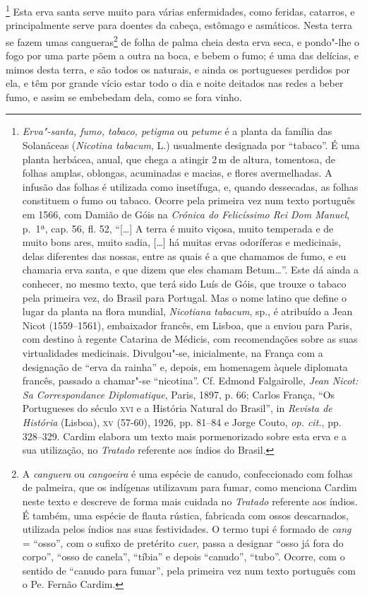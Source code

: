\footnote{ \textit{Erva"-santa, fumo, tabaco,
petigma} ou \textit{petume} é a planta da família das Solanáceas
(\textit{Nicotina tabacum}, L.) usualmente designada por ``tabaco''. É
uma planta herbácea, anual, que chega a atingir 2\,m de altura,
tomentosa, de folhas amplas, oblongas, acuminadas e macias, e flores
avermelhadas. A infusão das folhas é utilizada como insetífuga, e,
quando dessecadas, as folhas constituem o fumo ou tabaco. Ocorre pela
primeira vez num texto português em 1566, com Damião de Góis na
\textit{Crónica do Felicíssimo Rei Dom Manuel}, p.~1ª, cap. 56, fl. 52,
``[\ldots] A terra é muito viçosa, muito temperada e de muito bons ares,
muito sadia, [\ldots] há muitas ervas odoríferas e medicinais, delas
diferentes das nossas, entre as quais é a que chamamos de fumo, e eu
chamaria erva santa, e que dizem que eles chamam Betum\ldots''. Este dá
ainda a conhecer, no mesmo texto, que terá sido Luís de Góis, que
trouxe o tabaco pela primeira vez, do Brasil para Portugal. Mas o
nome latino que define o lugar da planta na flora mundial,
\textit{Nicotiana tabacum}, sp., é atribuído a Jean Nicot (1559--1561), 
embaixador francês, em Lisboa, que a enviou para Paris, com destino à
regente Catarina de Médicis, com recomendações sobre as suas
virtualidades medicinais. Divulgou"-se, inicialmente, na França com a
designação de ``erva da rainha'' e, depois, em homenagem àquele diplomata
francês, passado a chamar"-se ``nicotina''. Cf. Edmond Falgairolle,
\textit{Jean Nicot: Sa Correspondance Diplomatique}, Paris, 1897, p.
66; Carlos França, ``Os Portugueses do século \textsc{xvi} e a História Natural
do Brasil'', in \textit{Revista de História} (Lisboa), \textsc{xv} (57-60),
1926, pp. 81--84 e Jorge Couto, \textit{op. cit.}, pp. 328--329. Cardim
elabora um texto mais pormenorizado sobre esta erva e a sua utilização,
no \textit{Tratado} referente aos índios do Brasil.} Esta
erva santa serve muito para várias enfermidades, como feridas,
catarros, e principalmente serve para doentes da cabeça, estômago e
asmáticos. Nesta terra se fazem umas cangueras\footnote{ A
\textit{canguera} ou \textit{cangoeira} é uma espécie de canudo,
confeccionado com folhas de palmeira, que os indígenas utilizavam para
fumar, como menciona Cardim neste texto e descreve de forma mais
cuidada no \textit{Tratado} referente aos índios. É também, uma espécie
de flauta rústica, fabricada com ossos descarnados, utilizada pelos
índios nas suas festividades. O termo tupi é formado de \textit{cang} =
``osso'', com o sufixo de pretérito \textit{cuer}, passa a designar ``osso
já fora do corpo'', ``osso de canela'', ``tíbia'' e depois ``canudo'', ``tubo''.
Ocorre, com o sentido de ``canudo para fumar'', pela primeira vez num
texto português com o Pe. Fernão Cardim.} de folha de palma cheia desta
erva seca, e pondo"-lhe o fogo por uma parte põem a outra na boca, e
bebem o fumo; é uma das delícias, e mimos desta terra, e são todos os
naturais, e ainda os portugueses perdidos por ela, e têm por grande
vício estar todo o dia e noite deitados nas redes a beber fumo, e assim
se embebedam dela, como se fora vinho. 

